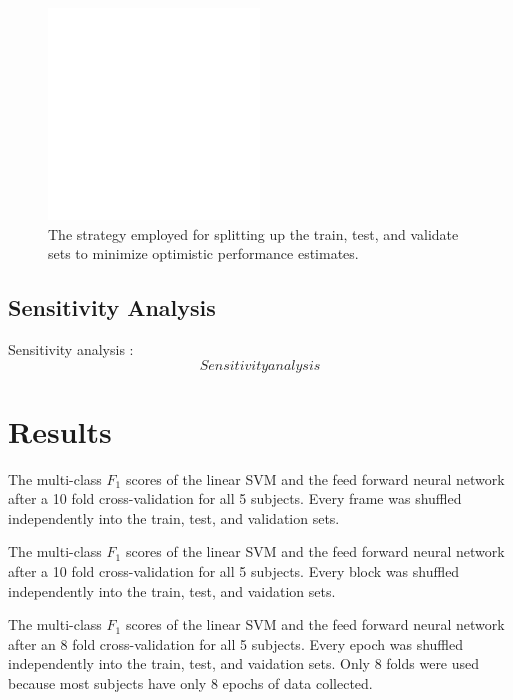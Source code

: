 \documentclass[twocolumn,final]{article}
\begin{document}
\begin{figure}[!htbp]
\centering
\includegraphics[width=0.5\textwidth]{figures/placeholder}
\caption{The strategy employed for splitting up the train, test, and validate sets to minimize optimistic performance estimates.}
\label{fig:data-split}
\end{figure}

\subsection{Sensitivity Analysis}
Sensitivity analysis \cite{Zurada1994}:
\begin{equation}
Sensitivity analysis
\end{equation}

\section{Results}

\begin{table}[!htbp]
\centering

\caption{
The multi-class $F_1$ scores of the linear SVM and the feed forward neural network after a 10 fold cross-validation for all 5 subjects. 
Every frame was shuffled independently into the train, test, and validation sets.}
\label{tab:frame-shuffle}
\end{table}

\begin{table}[!htbp]
\centering

\caption{
The multi-class $F_1$ scores of the linear SVM and the feed forward neural network after a 10 fold cross-validation for all 5 subjects. 
Every block was shuffled independently into the train, test, and vaidation sets.}
\label{tab:block-shuffle}
\end{table}

\begin{table}[!htbp]
\centering

\caption{
The multi-class $F_1$ scores of the linear SVM and the feed forward neural network after an 8 fold cross-validation for all 5 subjects. 
Every epoch was shuffled independently into the train, test, and vaidation sets. 
Only 8 folds were used because most subjects have only 8 epochs of data collected.}
\label{tab:epoch-shuffle}
\end{table}
\end{document}
